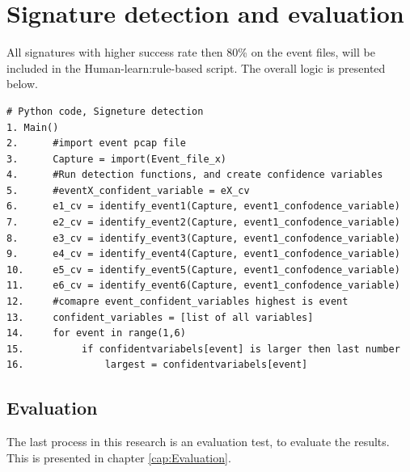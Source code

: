 \section{Signature detection and evaluation}
All signatures with higher success rate then 80\% on the event files, will be included in the Human-learn:rule-based script. The overall logic is presented below.
\begin{lstlisting}
# Python code, Signeture detection
1. Main()
2.      #import event pcap file
3.      Capture = import(Event_file_x)
4.      #Run detection functions, and create confidence variables
5.      #eventX_confident_variable = eX_cv  
6.      e1_cv = identify_event1(Capture, event1_confodence_variable)
7.      e2_cv = identify_event2(Capture, event1_confodence_variable)
8.      e3_cv = identify_event3(Capture, event1_confodence_variable)
9.      e4_cv = identify_event4(Capture, event1_confodence_variable)
10.     e5_cv = identify_event5(Capture, event1_confodence_variable)
11.     e6_cv = identify_event6(Capture, event1_confodence_variable)
12.     #comapre event_confident_variables highest is event
13.     confident_variables = [list of all variables]
14.     for event in range(1,6)
15.          if confidentvariabels[event] is larger then last number
16.              largest = confidentvariabels[event]  
\end{lstlisting}

\subsection{Evaluation}
The last process in this research is an evaluation test, to evaluate the results. This is presented in chapter \ref{cap:Evaluation}.